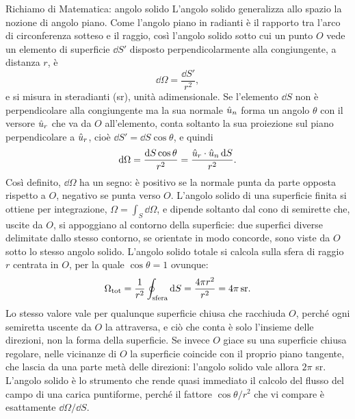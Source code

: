 \documentclass[11pt,a4paper]{article}
\begin{document}
\begin{riquadro}[label=ric:gauss:angolosolido]{Richiamo di Matematica: angolo solido}
L'angolo solido generalizza allo spazio la nozione di angolo piano. Come l'angolo piano in radianti è il rapporto tra l'arco di circonferenza sotteso e il raggio, così l'angolo solido sotto cui un punto $O$ vede un elemento di superficie $\dd S'$ disposto perpendicolarmente alla congiungente, a distanza $r$, è
\[
\dd\Omega=\frac{\dd S'}{r^2},
\]
e si misura in steradianti (sr), unità adimensionale. Se l'elemento $\dd S$ non è perpendicolare alla congiungente ma la sua normale $\hat{u}_n$ forma un angolo $\theta$ con il versore $\hat{u}_r$ che va da $O$ all'elemento, conta soltanto la sua proiezione sul piano perpendicolare a $\hat{u}_r$, cioè $\dd S'=\dd S\cos\theta$, e quindi
\[
\mathrm{d}\Omega=\frac{\mathrm{d} S\cos\theta}{r^2}=\frac{\hat{u}_r\cdot\hat{u}_n\,\mathrm{d} S}{r^2}.
\]
Così definito, $\dd\Omega$ ha un segno: è positivo se la normale punta da parte opposta rispetto a $O$, negativo se punta verso $O$. L'angolo solido di una superficie finita si ottiene per integrazione, $\Omega=\int_S\dd\Omega$, e dipende soltanto dal cono di semirette che, uscite da $O$, si appoggiano al contorno della superficie: due superfici diverse delimitate dallo stesso contorno, se orientate in modo concorde, sono viste da $O$ sotto lo stesso angolo solido. L'angolo solido totale si calcola sulla sfera di raggio $r$ centrata in $O$, per la quale $\cos\theta=1$ ovunque:
\[
\Omega_{\mathrm{tot}}=\frac{1}{r^2}\oint_{\mathrm{sfera}}\mathrm{d} S=\frac{4\pi r^2}{r^2}=4\pi\,\mathrm{sr}.
\]
Lo stesso valore vale per qualunque superficie chiusa che racchiuda $O$, perché ogni semiretta uscente da $O$ la attraversa, e ciò che conta è solo l'insieme delle direzioni, non la forma della superficie. Se invece $O$ giace su una superficie chiusa regolare, nelle vicinanze di $O$ la superficie coincide con il proprio piano tangente, che lascia da una parte metà delle direzioni: l'angolo solido vale allora $2\pi$ sr. L'angolo solido è lo strumento che rende quasi immediato il calcolo del flusso del campo di una carica puntiforme, perché il fattore $\cos\theta/r^2$ che vi compare è esattamente $\dd\Omega/\dd S$.
\end{riquadro}
\end{document}
